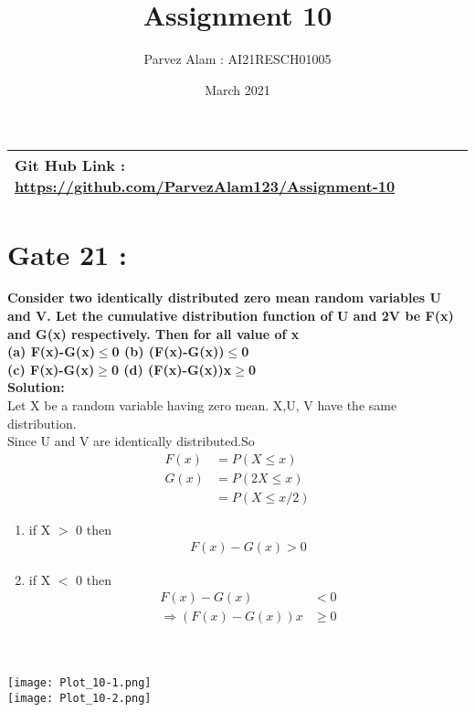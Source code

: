 \documentclass{article}
\title{Assignment 10}
\author{Parvez Alam : AI21RESCH01005 }
\date{March 2021}
\begin{document}
\maketitle
\begin{multicols}{2}
\begin{center}
    \begin{tabular}{|p{5cm}|}
    \hline
         Git Hub Link : \url{https://github.com/ParvezAlam123/Assignment-10} \\
    \hline
    \end{tabular}
\end{center}


\section{Gate 21 :}
\textbf{Consider two identically distributed zero mean random variables U and V. Let the cumulative distribution function of U and 2V be F(x) and G(x) respectively. Then for all value of x  \\
(a) F(x)-G(x)\(\leq\)0  (b) (F(x)-G(x))\(\leq\)0 \\
(c) F(x)-G(x)\(\geq\)0  (d) (F(x)-G(x))x\(\geq\)0} \\
\textbf{Solution: } \\
Let X be a random variable having zero mean. X,U, V have the same distribution. \\
Since U and V are identically distributed.So
\begin{align}
    F(x) &= P(X\leq x) \nonumber \\
    G(x) &= P(2X\leq x) \nonumber \\
         &= P(X \leq x/2) \nonumber
\end{align}
\begin{enumerate}
    \item if X \(>\) 0 then
\begin{align}
    F(x)-G(x)>0 \nonumber
\end{align}
     \item if X \(<\) 0 then
\begin{align}
    F(x)-G(x)&<0 \nonumber \\
    \Rightarrow (F(x)-G(x))x& \geq 0 \nonumber 
\end{align}
\end{enumerate}
\\ \\
\texttt{[image: Plot\_10-1.png]} \\
\texttt{[image: Plot\_10-2.png]}



\end{multicols}
\end{document}
